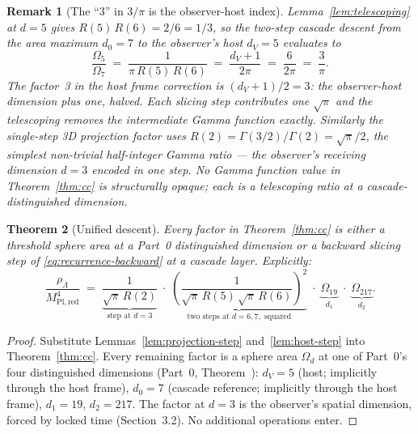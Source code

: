 \documentclass[11pt,a4paper]{article}
\newtheorem{theorem}{Theorem}[section]
\newtheorem{remark}[theorem]{Remark}
\begin{document}
\begin{remark}[The ``3'' in $3/\pi$ is the observer-host index]
\label{rem:host-index}
Lemma~\ref{lem:telescoping} at $d = 5$ gives $R(5)\,R(6) = 2/6 = 1/3$,
so the two-step cascade descent from the area maximum $d_0 = 7$ to the
observer's host $d_V = 5$ evaluates to
\[
\frac{\Omega_5}{\Omega_7}
\;=\; \frac{1}{\pi\,R(5)\,R(6)}
\;=\; \frac{d_V + 1}{2\pi}
\;=\; \frac{6}{2\pi}
\;=\; \frac{3}{\pi}.
\]
The factor~3 in the host frame correction is $(d_V + 1)/2 = 3$: the
observer-host dimension plus one, halved. Each slicing step
contributes one $\sqrt{\pi}$ and the telescoping removes the
intermediate Gamma function exactly. Similarly the single-step
3D projection factor uses
$R(2) = \Gamma(3/2)/\Gamma(2) = \sqrt{\pi}/2$, the simplest non-trivial
half-integer Gamma ratio --- the observer's receiving dimension
$d = 3$ encoded in one step. No Gamma function value in
Theorem~\ref{thm:cc} is structurally opaque; each is a telescoping
ratio at a cascade-distinguished dimension.
\end{remark}

\begin{theorem}[Unified descent]\label{thm:unified}
Every factor in Theorem~\ref{thm:cc} is either a threshold sphere area
at a Part~0 distinguished dimension or a backward slicing step of
\eqref{eq:recurrence-backward} at a cascade layer. Explicitly:
\[
\frac{\rho_\Lambda}{M^4_{\mathrm{Pl,red}}}
\;=\; \underbrace{\frac{1}{\sqrt{\pi}\,R(2)}}_{\text{step at }d=3}
\;\cdot\;\underbrace{\left(\frac{1}{\sqrt{\pi}\,R(5)\,\sqrt{\pi}\,R(6)}\right)^{\!2}}_{\text{two steps at }d=6,7,\text{ squared}}
\;\cdot\;\underbrace{\Omega_{19}}_{d_1}
\;\cdot\;\underbrace{\Omega_{217}}_{d_2}.
\]
\end{theorem}

\begin{proof}
Substitute Lemmas~\ref{lem:projection-step} and~\ref{lem:host-step}
into Theorem~\ref{thm:cc}. Every remaining factor is a sphere area
$\Omega_d$ at one of Part~0's four distinguished dimensions
(Part~0, Theorem~): $d_V = 5$ (host; implicitly through the host
frame), $d_0 = 7$ (cascade reference; implicitly through the host
frame), $d_1 = 19$, $d_2 = 217$. The factor at $d = 3$ is the
observer's spatial dimension, forced by locked time
(Section~3.2). No additional operations enter.
\end{proof}
\end{document}
